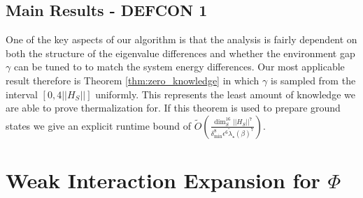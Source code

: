 \documentclass{article}
\newcommand{\norm}[1]{\left|\left| #1 \right|\right|}
\newcommand{\bigotilde}[1]{\widetilde{O} \left( #1 \right)}
\begin{document}
\subsection{Main Results - DEFCON 1}
One of the key aspects of our algorithm is that the analysis is fairly dependent on both the structure of the eigenvalue differences and whether the environment gap $\gamma$ can be tuned to to match the system energy differences. Our most applicable result therefore is Theorem \ref{thm:zero_knowledge} in which $\gamma$ is sampled from the interval $[0, 4\norm{H_S}]$ uniformly. This represents the least amount of knowledge we are able to prove thermalization for. If this theorem is used to prepare ground states we give an explicit runtime bound of $\bigotilde{\frac{\dim_S^{16} \norm{H_S}^7}{\delta_{\min}^8 \epsilon^6 \widetilde{\lambda}_\star(\beta)^7}}$. 




\section{Weak Interaction Expansion for $\Phi$} \label{sec:weak_coupling}
\end{document}
